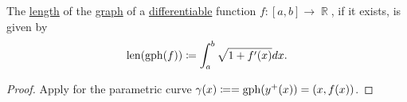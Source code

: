 \begin{corollary}\label{thm:length_of_function_graph}
  The \hyperref[def:length_of_parametric_curve]{length} of the \hyperref[def:multi_valued_function/graph]{graph} of a \hyperref[def:differentiability/frechet]{differentiable} function \( f: [a, b] \to \BbbR \), if it exists, is given by
  \begin{equation*}
    \operatorname{len}(\operatorname{gph}(f)) \coloneqq \int_a^b \sqrt{1 + f'(x)} dx.
  \end{equation*}
\end{corollary}
\begin{proof}
  Apply  for the parametric curve \( \gamma(x) \coloneqq = \operatorname{gph}(y^+(x)) = (x, f(x)) \).
\end{proof}
